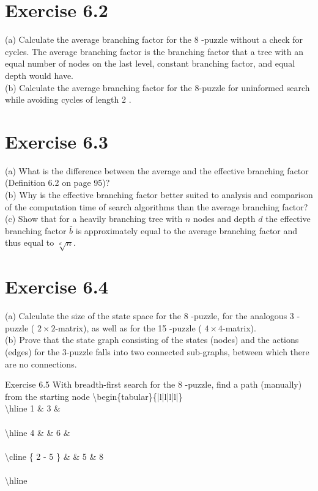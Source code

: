 \documentclass[10pt]{article}
\begin{document}
\section*{Exercise 6.2}
(a) Calculate the average branching factor for the 8 -puzzle without a check for cycles. The average branching factor is the branching factor that a tree with an equal number of nodes on the last level, constant branching factor, and equal depth would have.\\
(b) Calculate the average branching factor for the 8-puzzle for uninformed search while avoiding cycles of length 2 .

\section*{Exercise 6.3}
(a) What is the difference between the average and the effective branching factor (Definition 6.2 on page 95)?\\
(b) Why is the effective branching factor better suited to analysis and comparison of the computation time of search algorithms than the average branching factor?\\
(c) Show that for a heavily branching tree with $n$ nodes and depth $d$ the effective branching factor $\bar{b}$ is approximately equal to the average branching factor and thus equal to $\sqrt[d]{n}$.

\section*{Exercise 6.4}
(a) Calculate the size of the state space for the 8 -puzzle, for the analogous 3 -puzzle ( $2 \times 2$-matrix), as well as for the 15 -puzzle ( $4 \times 4$-matrix).\\
(b) Prove that the state graph consisting of the states (nodes) and the actions (edges) for the 3-puzzle falls into two connected sub-graphs, between which there are no connections.

Exercise 6.5 With breadth-first search for the 8 -puzzle, find a path (manually) from the starting node \textbackslash begin\{tabular\}\{|l|l|l|l|\}\\
\textbackslash hline 1 \& 3 \& \\
\\
\textbackslash hline 4 \& \& 6 \& \\
\\
\textbackslash cline \{ 2 - 5 \} \& \& 5 \& 8 \\
\\
\textbackslash hline
\end{document}
